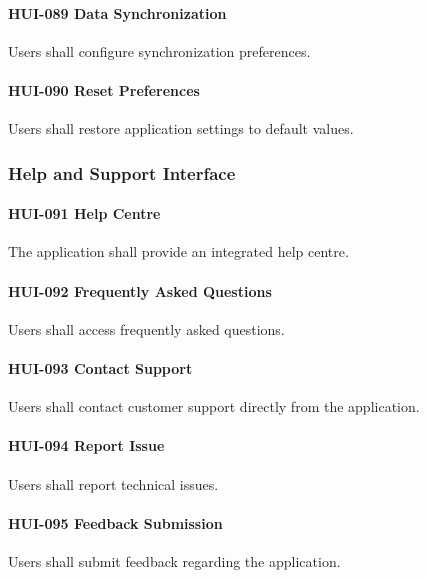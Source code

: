 \paragraph{HUI-089 Data Synchronization}

Users shall configure synchronization preferences.

\paragraph{HUI-090 Reset Preferences}

Users shall restore application settings to default values.


\subsubsection*{Help and Support Interface}

\paragraph{HUI-091 Help Centre}

The application shall provide an integrated help centre.

\paragraph{HUI-092 Frequently Asked Questions}

Users shall access frequently asked questions.

\paragraph{HUI-093 Contact Support}

Users shall contact customer support directly from the application.

\paragraph{HUI-094 Report Issue}

Users shall report technical issues.

\paragraph{HUI-095 Feedback Submission}

Users shall submit feedback regarding the application.

